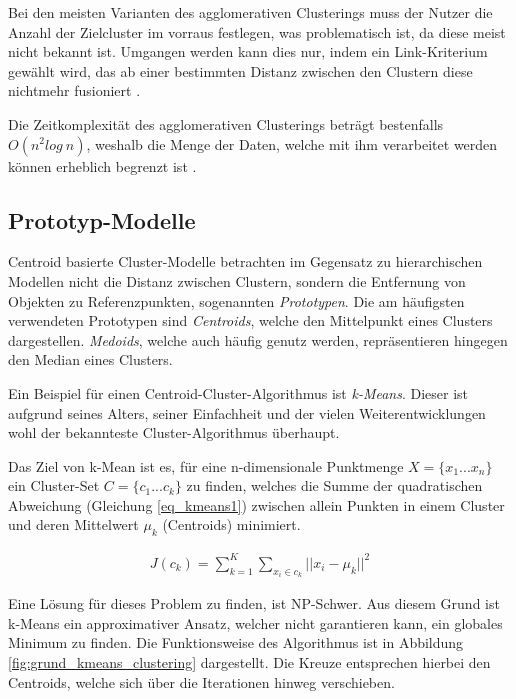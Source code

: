 Bei den meisten Varianten des agglomerativen Clusterings muss der Nutzer die Anzahl der Zielcluster im
vorraus festlegen, was problematisch ist, da diese meist nicht bekannt ist. Umgangen werden kann dies nur,
indem ein Link-Kriterium gewählt wird, das ab einer bestimmten Distanz zwischen den Clustern diese nichtmehr
fusioniert \cite[]{GeorgeSeif2018}.

Die Zeitkomplexität des agglomerativen Clusterings beträgt bestenfalls $O(n^2log\ n)$, weshalb die Menge der Daten,
welche mit ihm verarbeitet werden können erheblich begrenzt ist \cite[]{tan2007introduction}.

\subsection{Prototyp-Modelle}
\label{sec:grund_prototype_clustering}

Centroid basierte Cluster-Modelle betrachten im Gegensatz zu hierarchischen Modellen nicht die Distanz
zwischen Clustern, sondern die Entfernung von Objekten zu Referenzpunkten, sogenannten \textit{Prototypen}.
Die am häufigsten verwendeten Prototypen sind \textit{Centroids}, welche den Mittelpunkt eines Clusters dargestellen.
\textit{Medoids}, welche auch häufig genutz werden, repräsentieren hingegen den Median eines Clusters.

Ein Beispiel für einen Centroid-Cluster-Algorithmus ist \textit{k-Means}. Dieser ist aufgrund seines Alters,
seiner Einfachheit und der vielen Weiterentwicklungen wohl der bekannteste Cluster-Algorithmus überhaupt.

Das Ziel von k-Mean ist es, für eine n-dimensionale Punktmenge $X = \{ x_1 ... x_n \}$ ein Cluster-Set $C = \{ c_1 ... c_k \}$
zu finden, welches die Summe der quadratischen Abweichung (Gleichung \ref{eq_kmeans1}) zwischen allein Punkten in einem Cluster und deren
Mittelwert $\mu_k$ (Centroids) minimiert.

\begin{ceqn}
\begin{align}
    \label{eq_kmeans1}
    J(c_k) = \sum_{k=1}^K \sum_{x_i \in c_k} || x_i - \mu_k ||^2
\end{align}
\end{ceqn}

Eine Lösung für dieses Problem zu finden, ist NP-Schwer. Aus diesem Grund
ist k-Means ein approximativer Ansatz, welcher nicht garantieren kann, ein globales Minimum zu finden.
Die Funktionsweise des Algorithmus ist in Abbildung \ref{fig:grund_kmeans_clustering} dargestellt.
Die Kreuze entsprechen hierbei den Centroids, welche sich über die Iterationen hinweg verschieben.

